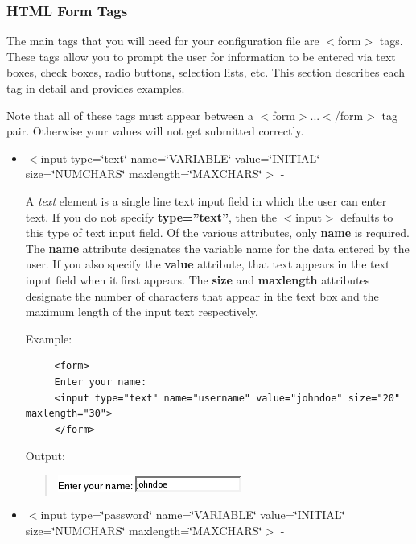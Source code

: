 \subsubsection*{HTML Form Tags}

The main tags that you will need for your configuration file are $<$form$>$
tags. These tags allow you to prompt the user for information to be
entered via text boxes, check boxes, radio buttons, selection lists,
etc. This section describes each tag in detail and provides examples.

Note that all of these tags must appear between a $<$form$>$...$<$/form$>$
tag pair. Otherwise your values will not get submitted correctly.

\begin{itemize}
\item $<$input type=\char`\"{}text\char`\"{} name=\char`\"{}VARIABLE\char`\"{}
value=\char`\"{}INITIAL\char`\"{} size=\char`\"{}NUMCHARS\char`\"{}
maxlength=\char`\"{}MAXCHARS\char`\"{}$>$ - 


A \textit{text} element is a single line text input field in which
the user can enter text. If you do not specify \textbf{type=''text''},
then the $<$input$>$ defaults to this type of text input field. Of the
various attributes, only \textbf{name} is required. The \textbf{name}
attribute designates the variable name for the data entered by the
user. If you also specify the \textbf{value} attribute, that text
appears in the text input field when it first appears. The \textbf{size}
and \textbf{maxlength} attributes designate the number of characters
that appear in the text box and the maximum length of the input text
respectively.

Example:

\begin{footnotesize}
\begin{verbatim}
     <form> 
     Enter your name: 
     <input type="text" name="username" value="johndoe" size="20" maxlength="30"> 
     </form>
\end{verbatim}
\end{footnotesize}

Output:


\begin{quote}
\includegraphics[scale=0.5]{figs/EnterYourName2}
\end{quote}
\item $<$input type=\char`\"{}password\char`\"{} name=\char`\"{}VARIABLE\char`\"{}
value=\char`\"{}INITIAL\char`\"{} size=\char`\"{}NUMCHARS\char`\"{}
maxlength=\char`\"{}MAXCHARS\char`\"{}$>$ -



\end{itemize}
